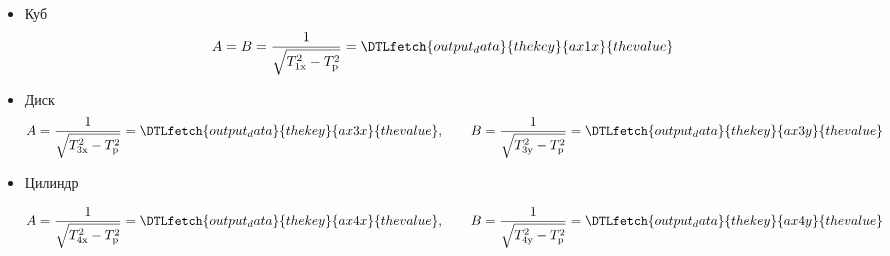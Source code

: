 \documentclass[a4paper,12pt]{article}
\newcommand{\var}[1]{\DTLfetch{output_data}{thekey}{#1}{thevalue}}
\begin{document}
\begin{itemize}
\begin{figure}[h!!]
        \end{figure}


        \item {Куб}
        $$ A = B = \frac{1}{\sqrt{T_{\text{1x}}^2 - T_{\text{p}}^2}} = \var{ax1x} $$


        \item{Диск}
        $$A = \frac{1}{\sqrt{T_{\text{3x}}^2 - T_{\text{p}}^2}} = \var{ax3x}, \qquad
        B = \frac{1}{\sqrt{T_{\text{3y}}^2 - T_{\text{p}}^2}} = \var{ax3y}$$


        \item{Цилиндр}

        $$A = \frac{1}{\sqrt{T_{\text{4x}}^2 - T_{\text{p}}^2}} = \var{ax4x}, \qquad
        B = \frac{1}{\sqrt{T_{\text{4y}}^2 - T_{\text{p}}^2}} = \var{ax4y}$$


        \begin{figure}[h!!]


\end{figure}
\end{itemize}
\end{document}
